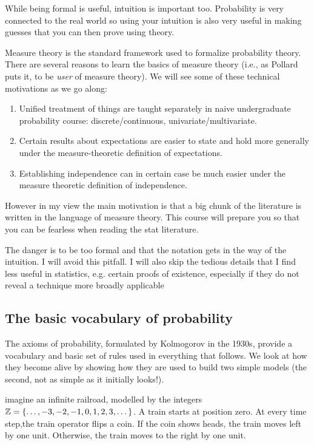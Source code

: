 \documentclass{article}
\begin{document}
 While being formal is useful, intuition is important too. Probability is very connected to the real world so using your intuition is also very useful in making guesses that you can then prove using theory.

 Measure theory is the standard framework used to formalize probability theory. There are several reasons to learn the basics of measure theory (i.e., as Pollard puts it, to be \emph{user} of measure theory). We will see some of these technical motivations as we go along: 
\begin{enumerate}
	\item Unified treatment of things are taught separately in naive undergraduate probability course: discrete/continuous, univariate/multivariate. 
	\item Certain results about expectations are easier to state and hold more generally under the measure-theoretic definition of expectations.
	\item Establishing independence can in certain case be much easier under the measure theoretic definition of independence.
\end{enumerate}
However in my view the main motivation is that a big chunk of the literature is written in the language of measure theory. This course will prepare you so that you can be fearless when reading the stat literature. 

The danger is to be too formal and that the notation gets in the way of the intuition. I will avoid this pitfall. I will also skip the tedious details that I find less useful in statistics, e.g. certain proofs of existence, especially if they do not reveal a technique more broadly applicable 


\subsection{The basic vocabulary of probability}

The axioms of probability, formulated by Kolmogorov in the 1930s, provide a vocabulary and basic set of rules used in everything that follows. We look at how they become alive by showing how they are used to build two simple models (the second, not as simple as it initially looks!).

 imagine an infinite railroad, modelled by the integers ${\mathbb Z} = \{\dots, -3, -2, -1, 0, 1, 2, 3, \dots\}$. A train starts at position zero. At every time step,the train operator flips a coin. If the coin shows heads, the train moves left by one unit. Otherwise, the train moves to the right by one unit. 
\end{document}

